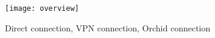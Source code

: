 \begin{figure}[htpb]
  \centering
  \texttt{[image: overview]}
  \caption{Direct connection, VPN connection, Orchid connection}
\end{figure}





